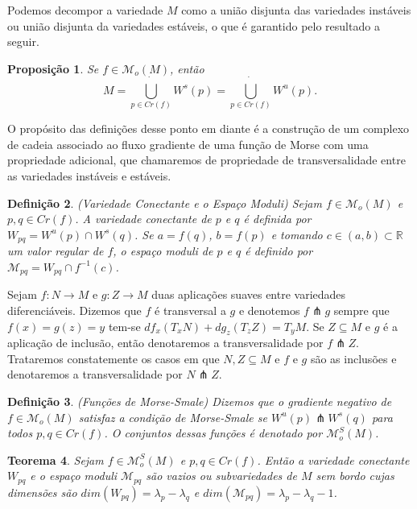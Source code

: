 \documentclass[12pt]{book}
\newtheorem{teorema}{Teorema}[section]
\newtheorem{definicao}[teorema]{Definição}
\newtheorem{proposicao}[teorema]{Proposição}
\newcommand{\espacomoduli}[2]{\mathcal{M}_{#1#2}}
\newcommand{\espacotangenteponto}[2]{T_{#1}#2}
\newcommand{\funcoesmorse}[1]{\mathcal{M}_{o}(#1)}
\newcommand{\funcoesmorsesmale}[1]{\mathcal{M}^{S}_{o}(#1)}
\newcommand{\pontoscriticos}[1]{\textit{Cr}(#1)}
\newcommand{\real}[1]{\mathbb{R}^{#1}}
\newcommand{\reta}{\real{}}
\newcommand{\variedadeconectantepontos}[2]{W_{#1#2}}
\newcommand{\variedadeestavel}[1]{W^{s}(#1)}
\newcommand{\variedadeinstavel}[1]{W^{u}(#1)}
\begin{document}
	Podemos decompor a variedade $M$ como a união disjunta das variedades instáveis ou união disjunta da variedades estáveis, o que é garantido pelo resultado a seguir.
	
	\begin{proposicao}\label{proposicao_uniao_variedade_instavel_estavel}
		Se $f \in \funcoesmorse{M}$, então
		$$
		M = \dot{\bigcup_{p \in \pontoscriticos{f}}}\variedadeestavel{p} = \dot{\bigcup_{p \in \pontoscriticos{f}}}\variedadeinstavel{p}.
		$$
	\end{proposicao}

	 O propósito das definições desse ponto em diante é a construção de um complexo de cadeia associado ao fluxo gradiente de uma função de Morse com uma propriedade adicional, que chamaremos de propriedade de transversalidade entre as variedades instáveis e estáveis.
	 
	 \begin{definicao}
	 	(Variedade Conectante e o Espaço Moduli) Sejam $f \in \funcoesmorse{M}$ e $p,q \in \pontoscriticos{f}$. A variedade conectante de $p$ e $q$ é definida por $\variedadeconectantepontos{p}{q} = \variedadeinstavel{p}\cap \variedadeestavel{q}$. Se $a = f(q)$, $b = f(p)$ e tomando $c \in (a, b) \subset \reta$ um valor regular de $f$, o espaço moduli de $p$ e $q$ é definido por $\espacomoduli{p}{q} = \variedadeconectantepontos{p}{q}\cap f^{-1}(c)$.
	 \end{definicao}
	 
	 Sejam $f: N\to M$ e $g: Z \to M$ duas aplicações suaves entre variedades diferenciáveis. Dizemos que $f$ é transversal a $g$ e denotemos $f \pitchfork g$ sempre que $f(x) = g(z) = y$ tem-se $df_{x}(\espacotangenteponto{x}{N}) + dg_{z}(\espacotangenteponto{z}{Z}) = \espacotangenteponto{y}{M} $. Se $Z \subseteq M$ e $g$ é a aplicação de inclusão, então denotaremos a transversalidade por $f\pitchfork Z$. Trataremos constatemente os casos em que $N, Z \subseteq M$ e $f$ e $g$ são as inclusões e denotaremos a transversalidade por $N \pitchfork Z$.
	 
	 \begin{definicao}
	 	(Funções de Morse-Smale) Dizemos que o gradiente negativo de $f \in \funcoesmorse{M}$ satisfaz a condição de Morse-Smale se $\variedadeinstavel{p}\pitchfork \variedadeestavel{q}$ para todos $p,q \in \pontoscriticos{f}$. O conjuntos dessas funções é denotado por $\funcoesmorsesmale{M}$.
	 \end{definicao}
	 
	 \begin{teorema}
	 	Sejam $f\in \funcoesmorsesmale{M}$ e $p,q \in \pontoscriticos{f}$. Então a variedade conectante $\variedadeconectantepontos{p}{q}$ e o espaço moduli $\espacomoduli{p}{q}$ são vazios ou subvariedades de $M$ sem bordo cujas dimensões são $dim(\variedadeconectantepontos{p}{q}) = \lambda_{p} -\lambda_{q}$ e $dim(\espacomoduli{p}{q}) = \lambda_{p} -\lambda_{q}-1$. 
	 \end{teorema}
	 
\end{document}
